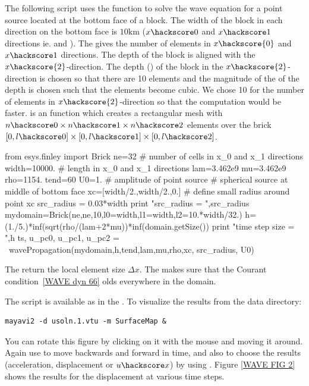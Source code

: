 The following script uses the  function to solve the
wave equation for a point source located at the bottom face of a block. The width of the block in 
each direction on the bottom face is $10\mbox{km}$ ($x\hackscore 0$ and $x\hackscore 1$ directions ie.  and ).
The  gives the number of elements in $x\hackscore{0}$ and $x\hackscore 1$ directions.  
The depth of the block is aligned with the $x\hackscore{2}$-direction. 
The depth () of the block in
the $x\hackscore{2}$-direction is chosen so that there are 10 elements and the magnitude of the
of the depth is chosen such that the elements 
become cubic. We chose 10 for the number of elements in $x\hackscore{2}$-direction so that the 
computation would be faster.  is an \finley function which creates a rectangular mesh 
with $n\hackscore 0 \times n\hackscore 1 \times n\hackscore2$ elements over the brick $[0,l\hackscore 0] \times [0,l\hackscore 1] \times [0,l\hackscore 2]$.
\begin{python}
from esys.finley import Brick
ne=32          # number of cells in x_0 and x_1 directions
width=10000.  # length in x_0 and x_1 directions
lam=3.462e9
mu=3.462e9
rho=1154.
tend=60
U0=1. # amplitude of point source
# spherical source at middle of bottom face
xc=[width/2.,width/2.,0.]
# define small radius around point xc
src_radius = 0.03*width
print "src_radius = ",src_radius
mydomain=Brick(ne,ne,10,l0=width,l1=width,l2=10.*width/32.)
h=(1./5.)*inf(sqrt(rho/(lam+2*mu))*inf(domain.getSize())
print "time step size = ",h
ts, u_pc0, u_pc1, u_pc2 =   \
                    wavePropagation(mydomain,h,tend,lam,mu,rho,xc, src_radius, U0)
\end{python}
The  return the local element size $\Delta x$. The 
\function{inf} makes sure that the Courant condition~\ref{WAVE dyn 66} olds everywhere in the domain. 

The script is available as  in the \ExampleDirectory {}. 
To visualize the results from the data directory: 
\begin{verbatim} 
mayavi2 -d usoln.1.vtu -m SurfaceMap &
\end{verbatim}
You can rotate this figure by clicking on it with the mouse and moving it around.
Again use \code{Configure Data} to move backwards and forward in time, and 
also to choose the results (acceleration, displacement or $u\hackscore x$) by using . Figure \ref{WAVE FIG 2} shows the results for the displacement at various time steps.

